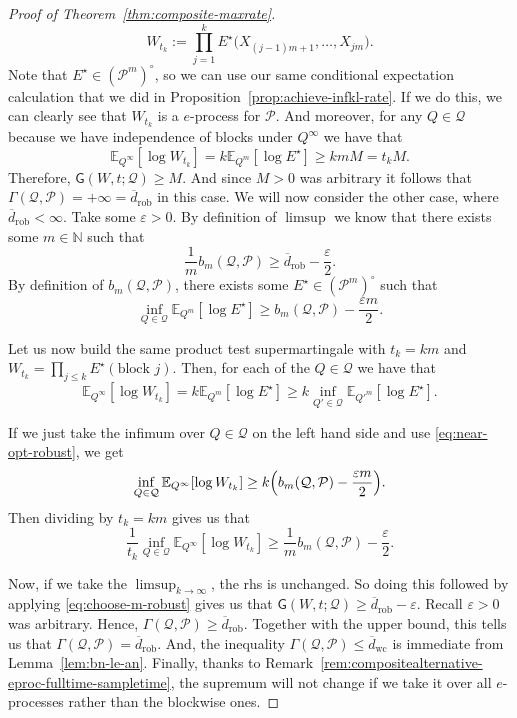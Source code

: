 \documentclass[11pt]{article}
\newcommand{\E}{\mathbb{E}}
\newcommand{\Pcal}{\mathcal{P}}
\newcommand{\Qcal}{\mathcal{Q}}
\theoremstyle{definition}
\theoremstyle{definition}
\begin{document}
\begin{proof}[Proof of Theorem~\ref{thm:composite-maxrate}]
\[
W_{t_k}:=\prod_{j=1}^k E^\star\bigl(X_{(j-1)m+1},\dots,X_{jm}\bigr).
\]
Note that $E^\star\in(\Pcal^m)^\circ$, so we can use our same conditional expectation calculation that we did in Proposition~\ref{prop:achieve-infkl-rate}. If we do this, we can clearly see that $W_{t_k}$ is a $e$-process for $\Pcal$. And moreover, for any $Q\in\Qcal$ because we have independence of blocks under $Q^\infty$ we have that
\[
\E_{Q^\infty}[\log W_{t_k}]=k\E_{Q^m}[\log E^\star]\ge kmM = t_k M.
\]
Therefore, $\mathsf{G}(W,t;\Qcal)\ge M$. And since $M>0$ was arbitrary it follows that $\Gamma(\Qcal,\Pcal)=+\infty=\overline d_{\mathrm{rob}}$ in this case. We will now consider the other case, where $\overline d_{\mathrm{rob}}<\infty$. Take some $\varepsilon>0$. By definition of $\limsup$ we know that there exists some $m\in\mathbb N$ such that
\begin{equation}\label{eq:choose-m-robust}
\frac{1}{m}b_m(\Qcal,\Pcal)\ge \overline d_{\mathrm{rob}}-\frac{\varepsilon}{2}.    
\end{equation}
By definition of $b_m(\Qcal,\Pcal)$, there exists some $E^\star\in(\Pcal^m)^\circ$ such that
\begin{equation}\label{eq:near-opt-robust}
\inf_{Q\in\Qcal}\E_{Q^m}[\log E^\star]\ge b_m(\Qcal,\Pcal)-\frac{\varepsilon m}{2}.
\end{equation}

Let us now build the same product test supermartingale with $t_k=km$ and $W_{t_k}=\prod_{j\le k}E^\star(\text{block }j)$. Then, for each of the $Q\in\Qcal$ we have that
\[
\E_{Q^\infty}[\log W_{t_k}]=k\E_{Q^m}[\log E^\star]\ge k\inf_{Q'\in\Qcal}\E_{Q'^m}[\log E^\star].
\]

If we just take the infimum over $Q\in\Qcal$ on the left hand side and use \eqref{eq:near-opt-robust}, we get
\[
\inf_{Q\in\Qcal}\E_{Q^\infty}[\log W_{t_k}]\ge k\Bigl(b_m(\Qcal,\Pcal)-\frac{\varepsilon m}{2}\Bigr).
\]
Then dividing by $t_k=km$ gives us that
\[
\frac{1}{t_k}\inf_{Q\in\Qcal}\E_{Q^\infty}[\log W_{t_k}] \ge \frac{1}{m}b_m(\Qcal,\Pcal)-\frac{\varepsilon}{2}.
\]

Now, if we take the $\limsup_{k\to\infty}$, the rhs is unchanged. So doing this followed by applying \eqref{eq:choose-m-robust} gives us that $\mathsf{G}(W,t;\Qcal)\ge \overline d_{\mathrm{rob}}-\varepsilon$. Recall $\varepsilon>0$ was arbitrary. Hence, $\Gamma(\Qcal, \Pcal)\ge \overline d_{\mathrm{rob}}$. Together with the upper bound, this tells us that $\Gamma(\Qcal,\Pcal)=\overline d_{\mathrm{rob}}$. And, the inequality $\Gamma(\Qcal,\Pcal)\le \overline d_{\mathrm{wc}}$ is immediate from Lemma~\ref{lem:bn-le-an}. Finally, thanks to Remark~\ref{rem:compositealternative-eproc-fulltime-sampletime}, the supremum will not change if we take it over all $e$-processes rather than the blockwise ones.
\end{proof}
\end{document}
